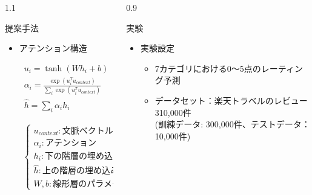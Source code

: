 \documentclass[unicode,10pt]{beamer}
\newlength{\mycolumnwidth}
\newcommand{\itemtitle}[1]{#1\\}
\begin{document}
\begin{frame}[t]
\begin{columns}[onlytextwidth,t]
\begin{column}{1.1\mycolumnwidth}
\begin{block}{提案手法}
\begin{figure}
      \end{figure}
      \begin{itemize}
        \item アテンション構造 \cite{yang16}
          {
            \large
            \hspace{-8em} %
            \begin{minipage}[t]{0.4\linewidth}
              \begin{gather*}
                u_i = \tanh (W h_{i} + b) \\
                \alpha_i = \frac{\exp (u^T_i u_{context})}
                                {\sum_i \exp (u^T_i u_{context})} \\
                \hat{h} = \sum_i \alpha_i h_i
              \end{gather*}
            \end{minipage}
            \begin{minipage}[t]{0.1\linewidth}
              \begin{gather*}
                \begin{cases}
                  u_{context} : \text{文脈ベクトル} \\
                  \alpha_i : \text{アテンション} \\
                  h_i : \text{下の階層の埋め込み} \\
                  \hat{h} : \text{上の階層の埋め込み} \\
                  W, b : \text{線形層のパラメータ}
                \end{cases}
              \end{gather*}
            \end{minipage}
          }
      \end{itemize}
    \end{block}
  \end{column}

  \begin{column}{0.9\mycolumnwidth}
    \begin{block}{実験}
      \begin{itemize}
        \item \itemtitle{実験設定}
          \begin{itemize}
            \item 7カテゴリにおける0〜5点のレーティング予測
            \item データセット：楽天トラベルのレビュー310,000件 \\
                  (訓練データ: 300,000件、テストデータ： 10,000件)
          \end{itemize}
      \end{itemize}


\end{block}
\end{column}
\end{columns}
\end{frame}
\end{document}
